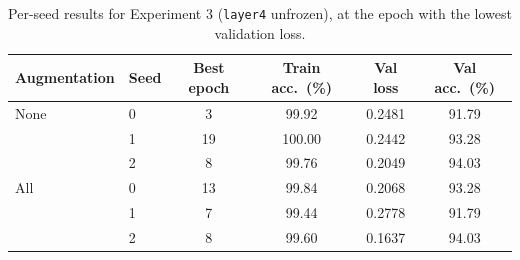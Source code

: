 
\begin{table}[ht]
    \centering
    \caption{Per-seed results for Experiment 3 (\texttt{layer4} unfrozen), at the epoch with the
             lowest validation loss.}
    \label{tab:exp3-seeds}
    \begin{tabular}{llcccc}
        \toprule
        Augmentation & Seed & Best epoch & Train acc.\ (\%) & Val loss & Val acc.\ (\%) \\
        \midrule
        None & 0 & 3  & 99.92  & 0.2481 & 91.79 \\
             & 1 & 19 & 100.00 & 0.2442 & 93.28 \\
             & 2 & 8  & 99.76  & 0.2049 & 94.03 \\
        \midrule
        All  & 0 & 13 & 99.84  & 0.2068 & 93.28 \\
             & 1 & 7  & 99.44  & 0.2778 & 91.79 \\
             & 2 & 8  & 99.60  & 0.1637 & 94.03 \\
        \bottomrule
    \end{tabular}
\end{table}

